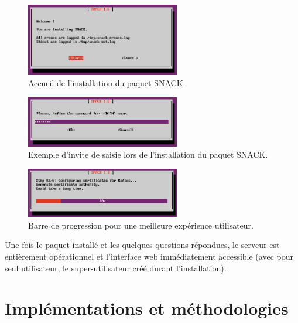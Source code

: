 \begin{figure}[!h]
	\begin{center}
	    \includegraphics[width=0.6\textwidth]{img/install_start.png}
	\end{center}
	\caption{Accueil de l'installation du paquet SNACK.}
	\label{install_start}
\end{figure}

\begin{figure}[!h]
	\begin{center}
	    \includegraphics[width=0.6\textwidth]{img/install_prompt.png}
	\end{center}
	\caption{Exemple d'invite de saisie lors de l'installation du paquet SNACK.}
	\label{install_prompt}
\end{figure}

\begin{figure}[!h]
	\begin{center}
	    \includegraphics[width=0.6\textwidth]{img/install_progress.png}
	\end{center}
	\caption{Barre de progression pour une meilleure expérience utilisateur.}
	\label{install_progress}
\end{figure}

Une fois le paquet installé et les quelques questions répondues, le serveur est entièrement opérationnel et l'interface web immédiatement accessible (avec pour seul utilisateur, le super-utilisateur créé durant l'installation).

\section{Implémentations et méthodologies}
